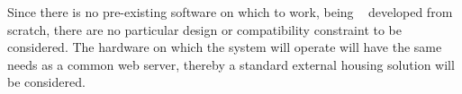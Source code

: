 Since there is no pre-existing software on which to work, being \projectname~ developed from scratch, there are no particular design or compatibility constraint to be considered. The hardware on which the system will operate will have the same needs as a common web server, thereby a standard external housing solution will be considered.